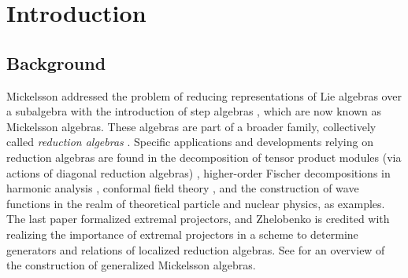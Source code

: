 \documentclass[pdftex]{sigma}
\numberwithin{equation}{section}
\begin{document}


\section{Introduction}\label{sec:Intro}

\subsection{Background}\label{subsec:Background}
Mickelsson addressed the problem of reducing representations of Lie algebras over a subalgebra with the introduction of step algebras \cite{mickelssonStepAlgebrasSemisimple1973}, which are now known as Mickelsson algebras. These algebras are part of a broader family, collectively called \emph{reduction algebras} \cite{khoroshkinDiagonalReductionAlgebras2010}.
Specific applications and developments relying on reduction algebras are found in the decomposition of tensor product modules (via actions of diagonal reduction algebras) \cite{hartwigDiagonalReductionAlgebra2022c,khoroshkinDiagonalReductionAlgebras2010}, higher-order Fischer decompositions in harmonic analysis \cite{debieHarmonicTransvectorAlgebra2017}, conformal field theory \cite{conleyBoundedLengthRepresentations2001,conleyConformalSymbolsAction2009}, and the construction of wave functions \cite{asherovaProjectionOperatorsSimple1973} in the realm of theoretical particle and nuclear physics, as examples. The last paper formalized extremal projectors, and Zhelobenko \cite{zhelobenkoExtremalProjectorsGeneralized1989} is credited with realizing the importance of extremal projectors in a scheme to determine generators and relations of localized reduction algebras. See \cite{zhelobenkoPrincipalStructuresMethods2006} for an overview of the construction of generalized Mickelsson algebras.
\end{document}
